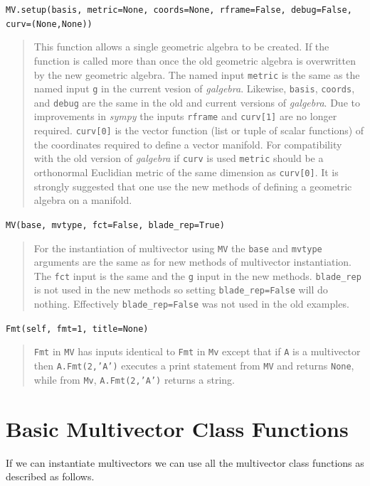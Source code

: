 \documentclass[12pt]{report}
\newcommand{\T}[1]{\texttt{#1}}
\begin{document}
\T{MV.setup(basis, metric=None, coords=None, rframe=False, debug=False, curv=(None,None))}
\begin{quote}
   This function allows a single geometric algebra to be created.  If the function is called more than once the old geometric algebra
   is overwritten by the new geometric algebra.  The named input \T{metric} is the same as the named input \T{g} in the current
   vesion of \emph{galgebra}.  Likewise, \T{basis}, \T{coords}, and \T{debug} are the same in the old and current versions of 
   \emph{galgebra}.  Due to improvements in \emph{sympy} the inputs \T{rframe} and \T{curv[1]} are no longer required.  \T{curv[0]} is
   the vector function (list or tuple of scalar functions) of the coordinates required to define a vector manifold.  For 
   compatibility with the old version of \emph{galgebra} if \T{curv} is used \T{metric} should be a orthonormal Euclidian 
   metric of the same dimension as \T{curv[0]}.  It is strongly suggested that one use the new methods of defining a geometric algebra
   on a manifold.
\end{quote} 

\T{MV(base, mvtype, fct=False, blade\_rep=True)}

\begin{quote}
	For the instantiation of multivector using \T{MV} the \T{base} and \T{mvtype} arguments are the same as for new methods of 
	multivector instantiation.  The \T{fct} input is the same and the \T{g} input in the new methods.  \T{blade_rep} is not used
	in the new methods so setting \T{blade_rep=False} will do nothing.  Effectively \T{blade_rep=False} was not used in the old
	examples.
\end{quote}

\T{Fmt(self, fmt=1, title=None)}

\begin{quote}
	\T{Fmt} in \T{MV} has inputs identical to \T{Fmt} in \T{Mv} except that if \T{A} is a multivector then \T{A.Fmt(2,'A')}
	executes a print statement from \T{MV} and returns \T{None}, while from \T{Mv}, \T{A.Fmt(2,'A')} returns a string. 
\end{quote}


\section{Basic Multivector Class Functions}

If we can instantiate multivectors we can use all the multivector class functions as described as follows.
\end{document}
